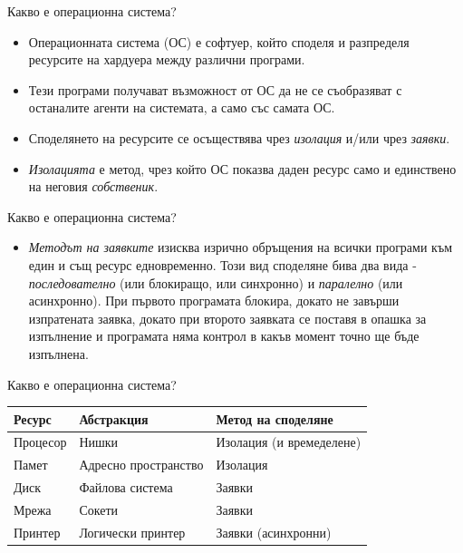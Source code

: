 \documentclass[14pt, aspectratio=169]{beamer}
\begin{document}
\begin{frame}{Какво е операционна система?}
  \begin{itemize}
    \item Операционната система (ОС) е софтуер, който споделя и разпределя
      ресурсите на хардуера между различни програми.
    \item Тези програми получават възможност от ОС да не се съобразяват с
      останалите агенти на системата, а само със самата ОС.
    \item Споделянето на ресурсите се осъществява чрез \emph{изолация} и/или
      чрез \emph{заявки}.
    \item \emph{Изолацията} е метод, чрез който ОС показва даден ресурс само и
      единствено на неговия \emph{собственик}.
  \end{itemize}
\end{frame}

\begin{frame}{Какво е операционна система?}
  \begin{itemize}
    \item \emph{Методът на заявките} изисква изрично обръщения на всички
      програми към един и същ ресурс едновременно. Този вид споделяне бива два
      вида - \emph{последователно} (или блокиращо, или синхронно) и
      \emph{паралелно} (или асинхронно). При първото програмата блокира, докато
      не завърши изпратената заявка, докато при второто заявката се поставя в
      опашка за изпълнение и програмата няма контрол в какъв момент точно ще
      бъде изпълнена.
  \end{itemize}
\end{frame}

\begin{frame}{Какво е операционна система?}
  \begin{tabular}{@{}lll@{}}
    \toprule
    \textbf{Ресурс} & \textbf{Абстракция} & \textbf{Метод на споделяне} \\
    \midrule
    Процесор & Нишки & Изолация (и времеделене) \\
    Памет & Адресно пространство & Изолация \\
    Диск & Файлова система & Заявки \\
    Мрежа & Сокети & Заявки \\
    Принтер & Логически принтер & Заявки (асинхронни) \\
    \bottomrule
  \end{tabular}
\end{frame}
\end{document}
